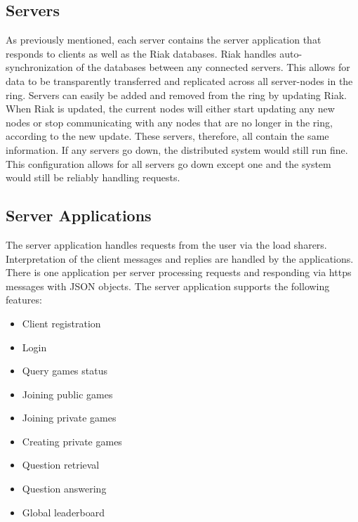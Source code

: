 \documentclass{dependencies/acm_proc_article-sp}
\begin{document}
\subsection{Servers}
As previously mentioned, each server contains the server application that responds to clients as well as the Riak databases.
Riak handles auto-synchronization of the databases between any connected servers.
This allows for data to be transparently transferred and replicated across all server-nodes in the ring.
Servers can easily be added and removed from the ring by updating Riak.
When Riak is updated, the current nodes will either start updating any new nodes or stop communicating with any nodes that are no longer in the ring, according to the new update.
These servers, therefore, all contain the same information.
If any servers go down, the distributed system would still run fine.
This configuration allows for all servers go down except one and the system would still be reliably handling requests.

\subsection{Server Applications}
The server application handles requests from the user via the load sharers.
Interpretation of the client messages and replies are handled by the applications. There is one application per server processing requests and responding via https messages with JSON objects.
The server application supports the following features:
\begin{itemize}
\item Client registration
\item Login
\item Query games status
\item Joining public games
\item Joining private games
\item Creating private games
\item Question retrieval
\item Question answering
\item Global leaderboard
\end{itemize}
\end{document}
